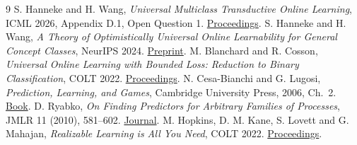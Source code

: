 \documentclass[11pt]{article}
\begin{document}
\begin{thebibliography}{9}
 S. Hanneke and H. Wang, \emph{Universal Multiclass Transductive Online Learning}, ICML 2026, Appendix D.1, Open Question 1. \href{https://proceedings.mlr.press/v306/hanneke26b.html}{Proceedings}.
 S. Hanneke and H. Wang, \emph{A Theory of Optimistically Universal Online Learnability for General Concept Classes}, NeurIPS 2024. \href{https://arxiv.org/abs/2501.08551}{Preprint}.
 M. Blanchard and R. Cosson, \emph{Universal Online Learning with Bounded Loss: Reduction to Binary Classification}, COLT 2022. \href{https://proceedings.mlr.press/v178/blanchard22a.html}{Proceedings}.
 N. Cesa-Bianchi and G. Lugosi, \emph{Prediction, Learning, and Games}, Cambridge University Press, 2006, Ch.~2. \href{https://doi.org/10.1017/CBO9780511546921}{Book}.
 D. Ryabko, \emph{On Finding Predictors for Arbitrary Families of Processes}, JMLR 11 (2010), 581--602. \href{https://jmlr.org/papers/v11/ryabko10a.html}{Journal}.
 M. Hopkins, D. M. Kane, S. Lovett and G. Mahajan, \emph{Realizable Learning is All You Need}, COLT 2022. \href{https://proceedings.mlr.press/v178/hopkins22a.html}{Proceedings}.
\end{thebibliography}
\end{document}
